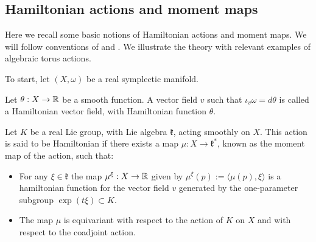 \subsection{Hamiltonian actions and moment maps} \label{basics:momentmaps}
Here we recall some basic notions of Hamiltonian actions and moment maps. We will follow conventions of \cite{da2006symplectic} and \cite{berman2014complex}. We illustrate the theory with relevant examples of algebraic torus actions.

To start, let \((X,\omega)\) be a real symplectic manifold.
\begin{definition}
Let \(\theta: X \to \mathbb{R}\) be a smooth function. A vector field \(v\) such that  \(\iota_v \omega = d \theta\) is called a Hamiltonian vector field, with Hamiltonian function \(\theta\). 
\end{definition}
\begin{definition}
Let \(K\) be a real Lie group, with Lie algebra \(\mathfrak{k}\), acting smoothly on \(X\). This action is said to be Hamiltonian if there exists a map \(\mu: X \to \mathfrak{k}^*\), known as the moment map of the action, such that:
\begin{itemize}
\item For any \(\xi \in \mathfrak{k}\) the map \(\mu^\xi : X \to \mathbb{R}\) given by \(\mu^\xi(p) := \langle \mu(p), \xi \rangle \) is a hamiltonian function for the vector field \(v\) generated by the one-parameter subgroup \(\exp(t \xi) \subset K\).
\item The map \(\mu\) is equivariant with respect to the action of \(K\) on \(X\) and with respect to the coadjoint action.
\end{itemize}
\end{definition}
